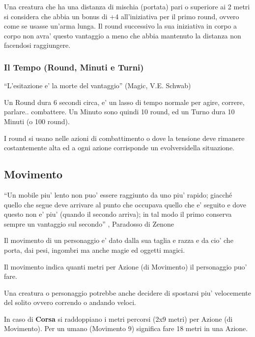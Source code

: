 \documentclass[a4paper,11pt,twoside,openany]{dndbook}
\begin{document}
Una creatura che ha una distanza di mischia (portata) pari o superiore
ai 2 metri si considera che abbia un bonus di +4 all'iniziativa per
il primo round, ovvero come se usasse un'arma lunga. Il round successivo
la sua iniziativa in corpo a corpo non avra' questo vantaggio a meno
che abbia mantenuto la distanza non facendosi raggiungere.

\subsubsection{Il Tempo (Round, Minuti e Turni)}

\label{il-tempo-round-minuti-e-turni}
\begin{quotebox}
``L'esitazione e' la morte del vantaggio'' (Magic, V.E. Schwab)
\end{quotebox}

Un Round dura 6 secondi circa, e' un lasso di tempo normale per agire, correre, parlare.. combattere. Un Minuto sono quindi 10 round, ed un Turno dura 10 Minuti (o 100 round).

I round si usano nelle azioni di combattimento o dove la tensione deve rimanere costantemente alta ed a ogni azione corrisponde un evolversidella situazione.

\pagebreak

\subsection{Movimento}

\label{movimento}

\begin{quotebox}``Un mobile piu' lento non puo' essere raggiunto da uno piu' rapido; giacché quello che segue deve arrivare al punto che occupava quello che e' seguito e dove questo non e' piu' (quando il secondo arriva); in tal modo il primo conserva sempre un vantaggio sul secondo'' , Paradosso di Zenone
\end{quotebox}

Il movimento di un personaggio e' dato dalla sua taglia e razza e da cio' che porta, dai pesi, ingombri ma anche magie ed oggetti magici.

Il movimento indica quanti metri per Azione (di Movimento) il personaggio puo' fare.

Una creatura o personaggio potrebbe anche decidere di spostarsi piu' velocemente del solito ovvero correndo o andando veloci.

In caso di \textbf{Corsa} si raddoppiano i metri percorsi (2x9 metri) per Azione (di Movimento). Per un umano (Movimento 9) significa fare 18 metri in una Azione.
\end{document}
